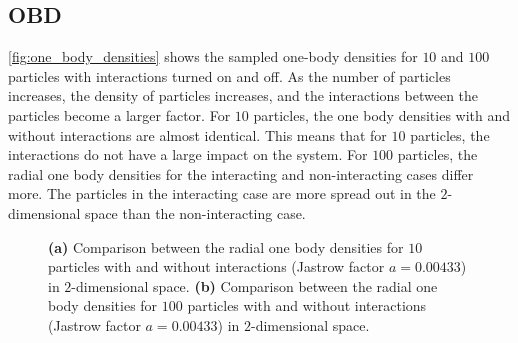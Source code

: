 \subsection{OBD}

\autoref{fig:one_body_densities} shows the sampled one-body densities for $10$ and $100$ particles with interactions turned on and off. As the number of particles increases, the density of particles increases, and the interactions between the particles become a larger factor. For $10$ particles, the one body densities with and without interactions are almost identical. This means that for $10$ particles, the interactions do not have a large impact on the system. For $100$ particles, the radial one body densities for the interacting and non-interacting cases differ more. The particles in the interacting case are more spread out in the $2$-dimensional space than the non-interacting case. 
\begin{figure}[H]
\centering
{} 
\qquad
{}
\caption{\textbf{(a)} Comparison between the radial one body densities for $10$ particles with and without interactions (Jastrow factor $a=0.00433$) in $2$-dimensional space. \textbf{(b)} Comparison between the radial one body densities for $100$ particles with and without interactions (Jastrow factor $a=0.00433$) in $2$-dimensional space.}
\label{fig:one_body_densities}
\end{figure}



